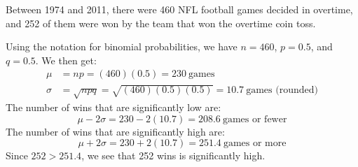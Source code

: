 \documentclass{beamer}
\begin{document}
\begin{frame}
\begin{example}
Between 1974 and 2011, there were 460 NFL football games decided in overtime, and 252 of them were won by the team that won the overtime coin toss. \pause

\vspace{1mm}
Using the notation for binomial probabilities, we have $n=460$, $p=0.5$, and $q=0.5$. We then get:
\begin{equation*}
\begin{aligned}
\mu &= np = (460)(0.5) = 230~\text{games} \\
\sigma &= \sqrt{npq} = \sqrt{(460)(0.5)(0.5)} = 10.7~\text{games (rounded)}
\end{aligned}
\end{equation*}\pause
The number of wins that are significantly low are:
\begin{equation*}
\mu-2\sigma = 230-2(10.7) = 208.6~\text{games or fewer}
\end{equation*}\pause
The number of wins that are significantly high are:
\begin{equation*}
\mu+2\sigma = 230+2(10.7) = 251.4~\text{games or more}
\end{equation*}\pause
Since $252>251.4$, we see that 252 wins is significantly high.
\end{example}
\end{frame}
\end{document}
